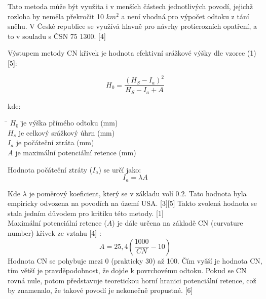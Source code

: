 \documentclass[a4paper,oneside,12pt]{book}
\begin{document}
\hspace{10mm} Tato metoda může být využita i v menších částech jednotlivých povodí, jejichž rozloha by neměla překročit 10 $km^{2}$ a není vhodná pro výpočet odtoku z tání sněhu. V České republice se využívá hlavně pro návrhy protierozních opatření, a to v souladu s ČSN 75 1300. [4]

Výstupem metody CN křivek je hodnota efektivní srážkové výšky dle vzorce (1) [5]:


\begin{equation}
H_{0} = \frac{\displaystyle (H_{S} - I_{a})^{2}}{\displaystyle H_{S} - I_{a} + A}
\end{equation}

kde:
\begin{tabbing}
    \hspace{10mm} \= $H_{0}$ \hspace{5mm} \= je výška přímého odtoku (mm) \\
    \> $H_{s}$ \> je celkový srážkový úhrn (mm) \\
    \> $I_{a}$ \> je počáteční ztráta (mm) \\
    \> $A$ \> je maximální potenciální retence (mm)
\end{tabbing}

Hodnota počáteční ztráty ($I_{a}$) se určí jako:
\begin{equation}
I_{a} = \lambda A
\end{equation}

\hspace{10mm} Kde $\lambda$ je poměrový koeficient, který se v základu volí $0.2$. Tato hodnota byla empiricky odvozena na povodích na území USA. [3][5] Takto zvolená hodnota se stala jedním důvodem pro kritiku této metody. [1] \\

\hspace{10mm} Maximální potenciální retence ($A$) je dále určena na základě CN (curvature number) křivek ze vztahu [4] : 
\begin{equation}
A = 25,4 (\frac{1000}{CN}-10)
\end{equation}
\hspace{10mm} Hodnota CN se pohybuje mezi 0 (prakticky 30) až 100. Čím vyšší je hodnota CN, tím větší je pravděpodobnost, že dojde k povrchovému odtoku. Pokud se CN rovná nule, potom představuje teoretickou horní
hranici potenciální retence, což by znamenalo, že takové povodí je nekonečně propustné. [6]
\end{document}

